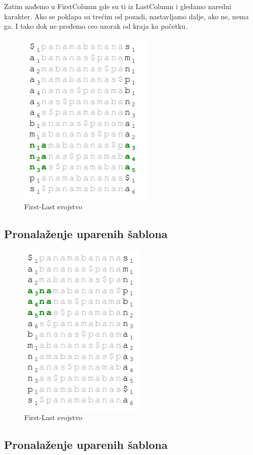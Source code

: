 Zatim nađemo u FirstColumn gde su ti iz LastColumn i gledamo naredni karakter. Ako se poklapa sa trećim od pozadi, nastavljamo dalje, ako ne, nema ga. I tako dok ne pređemo ceo uzorak od kraja ka početku.

\begin{figure}[h!]
\centering
\includegraphics[scale=0.5]{poglavlja/9/slike/traziAnukraj1.png}
\caption{First-Last svojstvo}
\label{slika:X}
\end{figure}
\subsection{Pronalaženje uparenih šablona}


\begin{figure}[h!]
\centering
\includegraphics[scale=0.5]{poglavlja/9/slike/traziAnukraj2.png}
\caption{First-Last svojstvo}
\label{slika:X}
\end{figure}
\subsection{Pronalaženje uparenih šablona}

